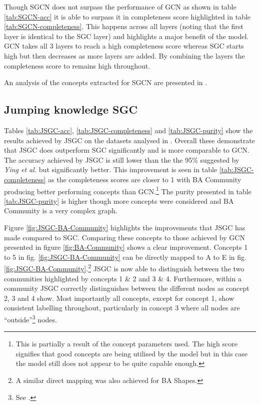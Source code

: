 Though SGCN does not surpass the performance of GCN as shown in table \ref{tab:SGCN-acc} it is able to surpass it in completeness score highlighted in table \ref{tab:SGCN-completeness}.
This happens across all layers (noting that the first layer is identical to the SGC layer) and highlights a major benefit of the model.
GCN takes all 3 layers to reach a high completeness score whereas SGC starts high but then decreases as more layers are added.
By combining the layers the completeness score to remains high throughout.

An analysis of the concepts extracted for SGCN are presented in .

\subsection{Jumping knowledge SGC}
\label{sec:Jump-SGC}





Tables \ref{tab:JSGC-acc}, \ref{tab:JSGC-completeness} and \ref{tab:JSGC-purity} show the results achieved by JSGC on the datasets analysed in .
Overall these demonstrate that JSGC does outperform SGC significantly and is more comparable to GCN.
The accuracy achieved by JSGC is still lower than the the 95\% suggested by \textit{Ying et al.}\cite{ying2019gnnexplainer} but significantly better.
This improvement is seen in table \ref{tab:JSGC-completeness} as the completeness scores are closer to 1 with BA Community producing better performing concepts than GCN.\footnote{This is partially a result of the concept parameters used. The high score signifies that good concepts are being utilised by the model but in this case the model still does not appear to be quite capable enough.}
The purity presented in table \ref{tab:JSGC-purity} is higher though more concepts were considered and BA Community is a very complex graph.


Figure \ref{fig:JSGC-BA-Community} highlights the improvements that JSGC has made compared to SGC.
Comparing these concepts to those achieved by GCN presented in figure \ref{fig:BA-Community} shows a clear improvement.
Concepts 1 to 5 in fig. \ref{fig:JSGC-BA-Community} can be directly mapped to A to E in fig. \ref{fig:JSGC-BA-Community}.\footnote{A similar direct mapping was also achieved for BA Shapes.}
JSGC is now able to distinguish between the two communities highlighted by concepts 1 \& 2 and 3 \& 4.
Furthermore, within a community JSGC correctly distinguishes between the different nodes as concept 2, 3 and 4 show.
Most importantly all concepts, except for concept 1, show consistent labelling throughout, particularly in concept 3 where all nodes are ``outside''\footnote{See .} nodes.

